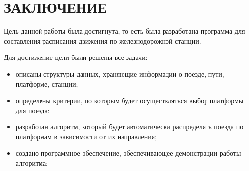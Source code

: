 \section*{\centering ЗАКЛЮЧЕНИЕ}

Цель данной работы была достигнута, то есть была разработана программа для составления расписания движения по железнодорожной станции.

Для достижение цели были решены все задачи:
\begin{itemize}
	\item описаны структуры данных, храняющие информации о поезде, пути, платформе, станции;
	\item определены критерии, по которым будет осуществляться выбор платформы для поезда;
	\item разработан алгоритм, который будет автоматически распределять поезда по платформам в зависимости от их направления;
	\item создано программное обеспечение, обеспечивающее демонстрации работы алгоритма;
\end{itemize}